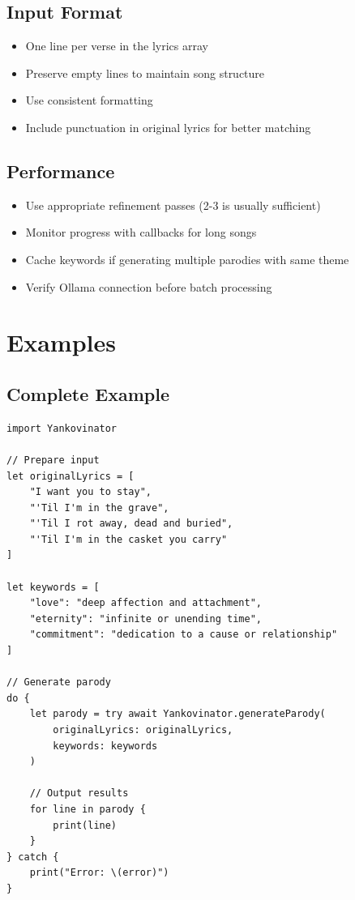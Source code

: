 \documentclass[11pt,a4paper]{article}
\begin{document}
\subsection{Input Format}

\begin{itemize}
    \item One line per verse in the lyrics array
    \item Preserve empty lines to maintain song structure
    \item Use consistent formatting
    \item Include punctuation in original lyrics for better matching
\end{itemize}

\subsection{Performance}

\begin{itemize}
    \item Use appropriate refinement passes (2-3 is usually sufficient)
    \item Monitor progress with callbacks for long songs
    \item Cache keywords if generating multiple parodies with same theme
    \item Verify Ollama connection before batch processing
\end{itemize}

\section{Examples}

\subsection{Complete Example}

\begin{lstlisting}
import Yankovinator

// Prepare input
let originalLyrics = [
    "I want you to stay",
    "'Til I'm in the grave",
    "'Til I rot away, dead and buried",
    "'Til I'm in the casket you carry"
]

let keywords = [
    "love": "deep affection and attachment",
    "eternity": "infinite or unending time",
    "commitment": "dedication to a cause or relationship"
]

// Generate parody
do {
    let parody = try await Yankovinator.generateParody(
        originalLyrics: originalLyrics,
        keywords: keywords
    )
    
    // Output results
    for line in parody {
        print(line)
    }
} catch {
    print("Error: \(error)")
}
\end{lstlisting}
\end{document}
